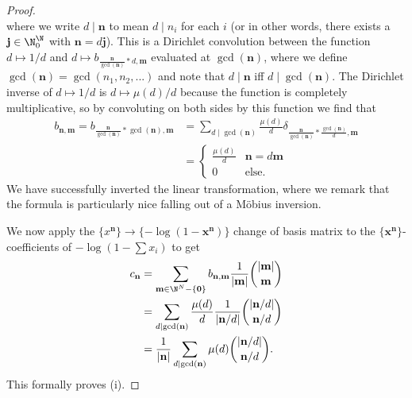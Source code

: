 \documentclass[12pt]{amsart}
\theoremstyle{plain}
\begin{document}
\begin{proof}
\[\]
where we write $d\mid \mathbf{n}$ to mean $d\mid n_i$ for each $i$ (or in other words, there exists a $\mathbf{j}\in \N^{\N}_0$ with $\mathbf{n} = d\mathbf{j}$). This is a Dirichlet convolution between the function $d\mapsto 1/d$ and $d\mapsto b_{\frac{\mathbf{n}}{\gcd(\mathbf{n})}*d,\mathbf{m}}$ evaluated at $\gcd(\mathbf{n})$, where we define $\gcd(\mathbf{n}) = \gcd(n_1,n_2,...)$ and note that $d\mid \mathbf{n}$ iff $d\mid \gcd(\mathbf{n})$. The Dirichlet inverse of $d\mapsto 1/d$ is $d\mapsto \mu(d)/d$ because the function is completely multiplicative, so by convoluting on both sides by this function we find that
\begin{align*}
b_{\mathbf{n},\mathbf{m}} = b_{\frac{\mathbf{n}}{\gcd(\mathbf{n})}*\gcd(\mathbf{n}),\mathbf{m}} &= \sum_{d\mid\gcd(\mathbf{n})}\frac{\mu(d)}{d}\delta_{\frac{\mathbf{n}}{\gcd(\mathbf{n})}*\frac{\gcd(\mathbf{n})}{d},\mathbf{m}}\\
&=\begin{cases}
\frac{\mu(d)}{d} & \mathbf{n}= d\mathbf{m}\\
0 & \text{else}.
\end{cases}
\end{align*}
We have successfully inverted the linear transformation, where we remark that the formula is particularly nice falling out of a M\"obius inversion.

We now apply the $\{x^\mathbf{n}\}\to\{-\log(1-\mathbf{x}^\mathbf{n})\}$ change of basis matrix to the $\{\mathbf{x}^\mathbf{n}\}$-coefficients of $-\log(1-\sum x_i)$ to get
\begin{align*}
c_{\mathbf{n}} &= \sum_{\mathbf{m}\in \N^N-\{\mathbf{0}\}} b_{\mathbf{n},\mathbf{m}}\frac{1}{|\mathbf{m}|}{|\mathbf{m}|\choose \mathbf{m}}\\
&= \sum_{d\mid \gcd(\mathbf{n})} \frac{\mu(d)}{d} \frac{1}{|\mathbf{n}/d|}{|\mathbf{n}/d|\choose \mathbf{n}/d}\\
&=\frac{1}{|\mathbf{n}|}\sum_{d\mid \gcd(\mathbf{n})} \mu(d){|\mathbf{n}/d|\choose \mathbf{n}/d}.
\end{align*}
This formally proves (i).


\end{proof}
\end{document}
